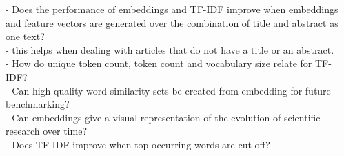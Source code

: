 \documentclass[../../Thesis.tex]{subfiles}
\begin{document}
- Does the performance of embeddings and TF-IDF improve when embeddings and feature vectors are generated over the combination of title and abstract as one text?\\
	- this helps when dealing with articles that do not have a title or an abstract.\\
- How do unique token count, token count and vocabulary size relate for TF-IDF?\\
- Can high quality word similarity sets be created from embedding for future benchmarking?\\
- Can embeddings give a visual representation of the evolution of scientific research over time?\\
- Does TF-IDF improve when top-occurring words are cut-off?\\
\end{document}
